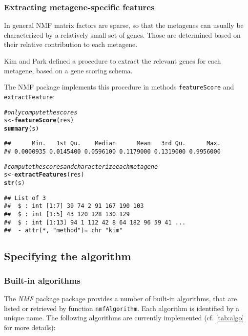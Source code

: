 \documentclass[a4paper]{article}\usepackage[]{graphicx}\usepackage[]{color}
\makeatletter
\newcommand{\hlcom}[1]{\textcolor[rgb]{0.678,0.584,0.686}{\textit{#1}}}%
\newcommand{\hlstd}[1]{\textcolor[rgb]{0.345,0.345,0.345}{#1}}%
\newcommand{\hlkwb}[1]{\textcolor[rgb]{0.69,0.353,0.396}{#1}}%
\newcommand{\hlkwd}[1]{\textcolor[rgb]{0.737,0.353,0.396}{\textbf{#1}}}%
\newenvironment{kframe}{%
 \def\at@end@of@kframe{}%
 \ifinner\ifhmode%
  \def\at@end@of@kframe{\end{minipage}}%
  \begin{minipage}{\columnwidth}%
 \fi\fi%
 \def\FrameCommand##1{\hskip\@totalleftmargin \hskip-\fboxsep
 \colorbox{shadecolor}{##1}\hskip-\fboxsep
     \hskip-\linewidth \hskip-\@totalleftmargin \hskip\columnwidth}%
 \MakeFramed {\advance\hsize-\width
   \@totalleftmargin\z@ \linewidth\hsize
   \@setminipage}}%
 {\par\unskip\endMakeFramed%
 \at@end@of@kframe}
\newenvironment{knitrout}{}{} %
\let\code=\texttt
\newcommand{\pkgname}[1]{\textit{#1}\xspace}
\newcommand{\Rpkg}[1]{\pkgname{#1} package\xspace}
\newcommand{\nmfpack}{\Rpkg{NMF}}
\renewcommand{\cite}[1]{\parencite{#1}}
\makeatother
\begin{document}
\subsubsection{Extracting metagene-specific features}

In general NMF matrix factors are sparse, so that the metagenes can usually be characterized by a relatively small set of genes. Those are determined based on 
their relative contribution to each metagene.

Kim and Park \cite{KimH2007} defined a procedure to extract the relevant genes for each metagene, based on a gene scoring schema.

The NMF package implements this procedure in methods \code{featureScore} and \code{extractFeature}:

\begin{knitrout}
\color{fgcolor}\begin{kframe}
\begin{alltt}
\hlcom{# only compute the scores}
\hlstd{s} \hlkwb{<-} \hlkwd{featureScore}\hlstd{(res)}
\hlkwd{summary}\hlstd{(s)}
\end{alltt}
\begin{verbatim}
##      Min.   1st Qu.    Median      Mean   3rd Qu.      Max. 
## 0.0000935 0.0145400 0.0596100 0.1179000 0.1319000 0.9956000
\end{verbatim}
\begin{alltt}
\hlcom{# compute the scores and characterize each metagene}
\hlstd{s} \hlkwb{<-} \hlkwd{extractFeatures}\hlstd{(res)}
\hlkwd{str}\hlstd{(s)}
\end{alltt}
\begin{verbatim}
## List of 3
##  $ : int [1:7] 39 74 2 91 167 190 103
##  $ : int [1:5] 43 120 128 130 129
##  $ : int [1:13] 94 1 112 42 8 64 182 96 59 41 ...
##  - attr(*, "method")= chr "kim"
\end{verbatim}
\end{kframe}
\end{knitrout}

\subsection{Specifying the algorithm}\label{sec:algo}

\subsubsection{Built-in algorithms}
The \nmfpack package provides a number of built-in algorithms, that are listed or retrieved by function \code{nmfAlgorithm}. 
Each algorithm is identified by a unique name.
The following algorithms are currently implemented (cf. \cref{tab:algo} for more details):
\end{document}
